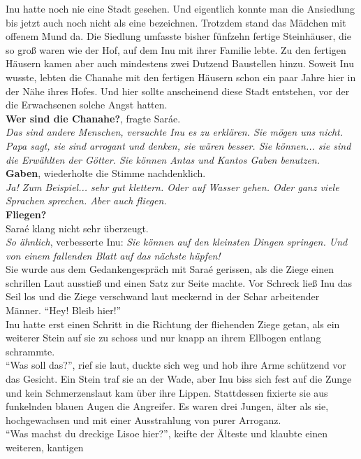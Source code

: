 Inu hatte noch nie eine Stadt gesehen. Und eigentlich konnte man die Ansiedlung bis jetzt auch noch 
nicht als eine bezeichnen. Trotzdem stand das Mädchen mit offenem Mund da. Die Siedlung umfasste 
bisher fünfzehn fertige Steinhäuser, die so groß waren wie der Hof, auf dem Inu mit ihrer Familie 
lebte. Zu den fertigen Häusern kamen aber auch mindestens zwei Dutzend Baustellen hinzu. Soweit Inu 
wusste, lebten die Chanahe mit den fertigen Häusern schon ein paar Jahre hier in der Nähe ihres 
Hofes. Und hier sollte anscheinend diese Stadt entstehen, vor der die Erwachsenen solche Angst 
hatten. \\
\textbf{Wer sind die Chanahe?}, fragte Saráe. \\
\textit{Das sind andere Menschen, versuchte Inu es zu erklären. Sie mögen uns nicht. Papa sagt, sie 
sind arrogant und denken, sie wären besser. Sie können... sie sind die Erwählten der Götter. Sie 
können Antas und Kantos Gaben benutzen.}\\
\textbf{Gaben}, wiederholte die Stimme nachdenklich.\\
\textit{Ja! Zum Beispiel... sehr gut klettern. Oder auf Wasser gehen. Oder ganz viele Sprachen 
sprechen. Aber auch fliegen.}\\
\textbf{Fliegen?}\\
Saraé klang nicht sehr überzeugt. \\
\textit{So ähnlich}, verbesserte Inu: \textit{Sie können auf den kleinsten Dingen springen. Und von 
einem fallenden Blatt auf das nächste hüpfen!}\\
Sie wurde aus dem Gedankengespräch mit Saraé gerissen, als die Ziege einen schrillen Laut ausstieß 
und einen Satz zur Seite machte. Vor Schreck ließ Inu das Seil los und die Ziege verschwand laut 
meckernd in der Schar arbeitender Männer. ``Hey! Bleib hier!''\\
Inu hatte erst einen Schritt in die Richtung der fliehenden Ziege getan, als ein weiterer Stein auf 
sie zu schoss und nur knapp an ihrem Ellbogen entlang schrammte. \\
``Was soll das?'', rief sie laut, duckte sich weg und hob ihre Arme schützend vor das Gesicht.
Ein Stein traf sie an der Wade, aber Inu biss sich fest auf die Zunge und kein Schmerzenslaut kam 
über ihre Lippen. Stattdessen fixierte sie aus funkelnden blauen Augen die Angreifer. Es waren drei 
Jungen, älter als sie, hochgewachsen und mit einer Ausstrahlung von purer Arroganz. \\
``Was machst du dreckige Lisoe hier?'', keifte der Älteste und klaubte einen weiteren, kantigen 
